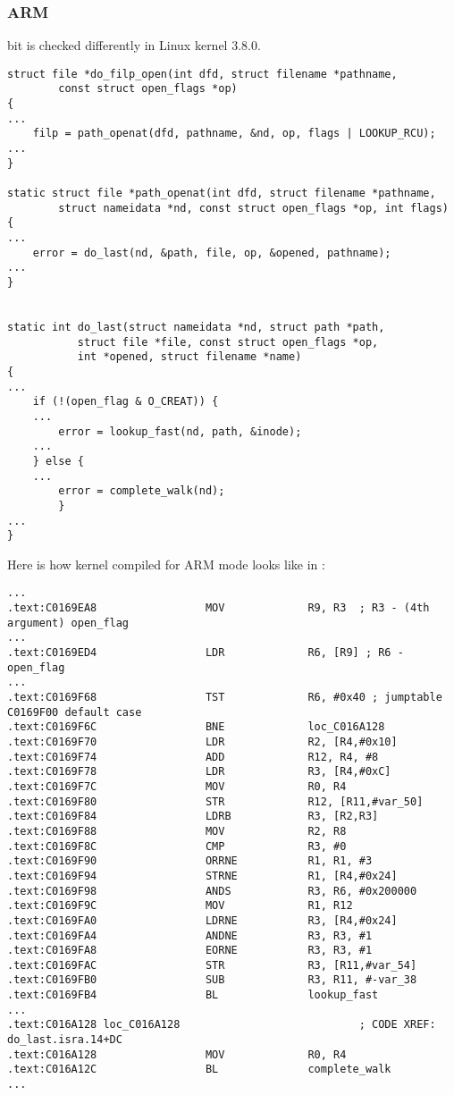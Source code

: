 \subsubsection{ARM}

{ bit is checked differently in Linux kernel 3.8.0.}

\begin{lstlisting}[caption=linux kernel 3.8.0]
struct file *do_filp_open(int dfd, struct filename *pathname,
		const struct open_flags *op)
{
...
	filp = path_openat(dfd, pathname, &nd, op, flags | LOOKUP_RCU);
...
}

static struct file *path_openat(int dfd, struct filename *pathname,
		struct nameidata *nd, const struct open_flags *op, int flags)
{
...
	error = do_last(nd, &path, file, op, &opened, pathname);
...
}


static int do_last(struct nameidata *nd, struct path *path,
		   struct file *file, const struct open_flags *op,
		   int *opened, struct filename *name)
{
...
	if (!(open_flag & O_CREAT)) {
    ...
		error = lookup_fast(nd, path, &inode);
    ...
	} else {
    ...
		error = complete_walk(nd);
        }
...
}
\end{lstlisting}

{Here is how kernel compiled for ARM mode looks like in \IDA:}

\begin{lstlisting}[caption=do\_last() (vmlinux)]
...
.text:C0169EA8                 MOV             R9, R3  ; R3 - (4th argument) open_flag
...
.text:C0169ED4                 LDR             R6, [R9] ; R6 - open_flag
...
.text:C0169F68                 TST             R6, #0x40 ; jumptable C0169F00 default case
.text:C0169F6C                 BNE             loc_C016A128
.text:C0169F70                 LDR             R2, [R4,#0x10]
.text:C0169F74                 ADD             R12, R4, #8
.text:C0169F78                 LDR             R3, [R4,#0xC]
.text:C0169F7C                 MOV             R0, R4
.text:C0169F80                 STR             R12, [R11,#var_50]
.text:C0169F84                 LDRB            R3, [R2,R3]
.text:C0169F88                 MOV             R2, R8
.text:C0169F8C                 CMP             R3, #0
.text:C0169F90                 ORRNE           R1, R1, #3
.text:C0169F94                 STRNE           R1, [R4,#0x24]
.text:C0169F98                 ANDS            R3, R6, #0x200000
.text:C0169F9C                 MOV             R1, R12
.text:C0169FA0                 LDRNE           R3, [R4,#0x24]
.text:C0169FA4                 ANDNE           R3, R3, #1
.text:C0169FA8                 EORNE           R3, R3, #1
.text:C0169FAC                 STR             R3, [R11,#var_54]
.text:C0169FB0                 SUB             R3, R11, #-var_38
.text:C0169FB4                 BL              lookup_fast
...
.text:C016A128 loc_C016A128                            ; CODE XREF: do_last.isra.14+DC
.text:C016A128                 MOV             R0, R4
.text:C016A12C                 BL              complete_walk
...
\end{lstlisting}

